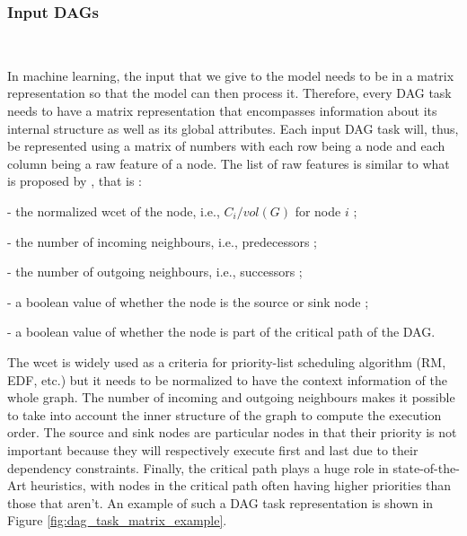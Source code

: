 \subsubsection{Input DAGs}
~

In machine learning, the input that we give to the model
needs to be in a matrix representation so that the model can 
then process it. Therefore, every DAG task needs to have
a matrix representation that encompasses information 
about its internal structure as well as its global attributes.  
Each input DAG task will, thus, be represented using 
a matrix of numbers with each row being a node
and each column being a raw feature of a node.
The list of raw features is similar to what is proposed by \citet{Lee2021GlobalDagSchedDRL},
that is :
\begin{list}{}{}
    \item - the normalized wcet of the node, i.e., $C_i / vol(G)$ for node $i$ ;
    \item - the number of incoming neighbours, i.e., predecessors ;
    \item - the number of outgoing neighbours, i.e., successors ;
    \item - a boolean value of whether the node is the source or sink node ;
    \item - a boolean value of whether the node is part of the critical path of the DAG.
\end{list}

The wcet is widely used as a criteria for priority-list scheduling algorithm (RM, EDF\cite{buttazzo2005RMvsEDF}, etc.)
but it needs to be normalized to have the context information of the whole graph.
The number of incoming and outgoing neighbours makes it possible 
to take into account the inner structure of the graph to compute the execution order.
The source and sink nodes are particular nodes in that their priority
is not important because they will respectively execute first and last due to their dependency constraints.
Finally, the critical path plays a huge role in state-of-the-Art heuristics\cite{He2019DagIntra}\cite{zhao2020DAGsched},
with nodes in the critical path often having higher priorities than those
that aren't.
An example of such a DAG task representation is shown in Figure \ref{fig:dag_task_matrix_example}.

